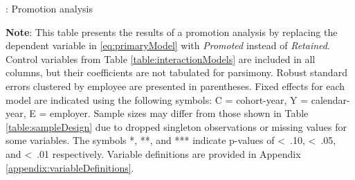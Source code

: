 \documentclass[11pt]{article}
\begin{document}
\clearpage
\begin{table}[!htbp]
    \begin{threeparttable}[b]
        
        \captionsetup{labelfont=bf, singlelinecheck=off, justification=raggedright, labelsep=none}
        \caption{: Promotion analysis}  
        
        \raggedright
        \hspace*{-\leftmargin}
        \vspace*{-0.75cm}
        \normalsize

        \noindent
        
        
        \begin{tablenotes}
            \footnotesize
            \item \textbf{Note}: This table presents the results of a promotion analysis by replacing the dependent variable in \ref{eq:primaryModel} with \textit{Promoted} instead of \textit{Retained}. Control variables from Table \ref{table:interactionModels} are included in all columns, but their coefficients are not tabulated for parsimony. Robust standard errors clustered by employee are presented in parentheses. Fixed effects for each model are indicated using the following symbols: C = cohort-year, Y = calendar-year, E = employer. Sample sizes may differ from those shown in Table \ref{table:sampleDesign} due to dropped singleton observations or missing values for some variables. The symbols *, **, and *** indicate p-values of \textless\, .10, \textless\, .05, and \textless\, .01 respectively. Variable definitions are provided in Appendix \ref{appendix:variableDefinitions}.  
        \end{tablenotes}
        \label{table:promotionModels}
    \end{threeparttable}
\end{table}
\end{document}
